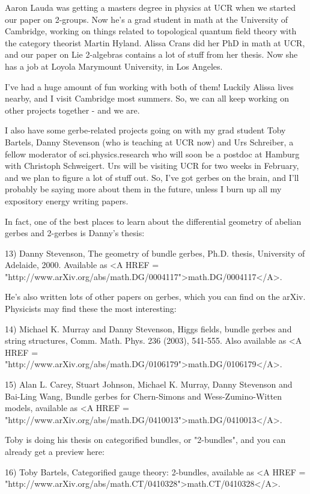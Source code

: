 Aaron Lauda was getting a masters degree in physics at UCR when we started 
our paper on 2-groups.  Now he's a grad student in math at the University of
Cambridge, working on things related to topological quantum field theory 
with the category theorist Martin Hyland.  Alissa Crans did her PhD in math
at UCR, and our paper on Lie 2-algebras contains a lot of stuff from her 
thesis.  Now she has a job at Loyola Marymount University, in Los Angeles.  

I've had a huge amount of fun working with both of them!  Luckily Alissa 
lives nearby, and I visit Cambridge most summers.  So, we can all keep 
working on other projects together - and we are.

I also have some gerbe-related projects going on with my grad student
Toby Bartels, Danny Stevenson (who is teaching at UCR now) and Urs 
Schreiber, a fellow moderator of sci.physics.research who will soon be 
a postdoc at Hamburg with Christoph Schweigert.  Urs will be visiting 
UCR for two weeks in February, and we plan to figure a lot of stuff out.
So, I've got gerbes on the brain, and I'll probably be saying more about 
them in the future, unless I burn up all my expository energy writing 
papers.

In fact, one of the best places to learn about the differential geometry 
of abelian gerbes and 2-gerbes is Danny's thesis:

13) Danny Stevenson, The geometry of bundle gerbes, Ph.D. thesis, 
University of Adelaide, 2000.  Available as <A HREF = "http://www.arXiv.org/abs/math.DG/0004117">math.DG/0004117</A>.

He's also written lots of other papers on gerbes, which you can find
on the arXiv.  Physicists may find these the most interesting:

14) Michael K. Murray and Danny Stevenson, Higgs fields, bundle gerbes and
string structures, Comm. Math. Phys. 236 (2003), 541-555.  Also available
as <A HREF = "http://www.arXiv.org/abs/math.DG/0106179">math.DG/0106179</A>.

15) Alan L. Carey, Stuart Johnson, Michael K. Murray, Danny Stevenson
and Bai-Ling Wang, Bundle gerbes for Chern-Simons and Wess-Zumino-Witten
models, available as <A HREF = "http://www.arXiv.org/abs/math.DG/0410013">math.DG/0410013</A>.

Toby is doing his thesis on categorified bundles, or "2-bundles", and
you can already get a preview here:

16) Toby Bartels, Categorified gauge theory: 2-bundles, available as
<A HREF = "http://www.arXiv.org/abs/math.CT/0410328">math.CT/0410328</A>.

